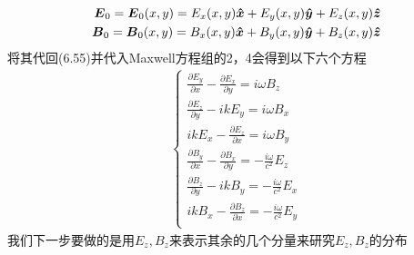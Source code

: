 \documentclass[14pt,oneside]{book}
\def \E{\vb*{E}}
\def \B{\vb*{B}}
\def \x{\vb*{\hat x}}
\def \y{\vb*{\hat y}}
\def \z{\vb*{\hat z}}
\begin{document}
\begin{large}
\begin{equation}
\begin{aligned}
	  \E_0=\E_0(x,y)=E_x(x,y)\x+E_y(x,y)\y+E_z(x,y)\z\\
	  \B_0=\B_0(x,y)=B_x(x,y)\x+B_y(x,y)\y+B_z(x,y)\z
\end{aligned}
\end{equation}
将其代回(6.55)并代入Maxwell方程组的2，4会得到以下六个方程
\begin{align}
	\begin{cases}
		\frac{\partial E_y}{\partial x}-\frac{\partial E_x}{\partial y}=i \omega B_z\\
		\frac{\partial E_z}{\partial y}-i k E_y=i \omega B_x \\
		i k E_x-\frac{\partial E_z}{\partial x}=i \omega B_y\\
		\frac{\partial B_y}{\partial x}-\frac{\partial B_x}{\partial y}=-\frac{i \omega}{c^2} E_z\\
		\frac{\partial B_z}{\partial y}-i k B_y=-\frac{i \omega}{c^2} E_x\\
		i k B_x-\frac{\partial B_z}{\partial x}=-\frac{i \omega}{c^2} E_y\\
	\end{cases}
\end{align}
我们下一步要做的是用$E_z,B_z$来表示其余的几个分量来研究$E_z,B_z$的分布


\end{large}
\end{document}
